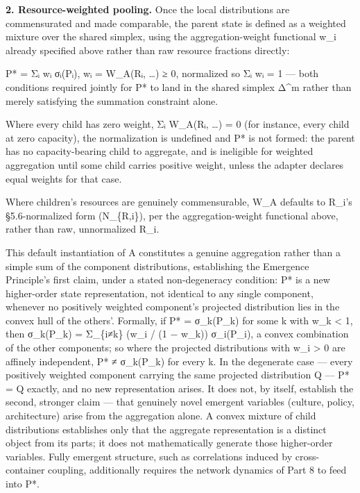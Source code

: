 \documentclass[
]{article}
\begin{document}
\textbf{2. Resource-weighted pooling.} Once the local distributions are
commensurated and made comparable, the parent state is defined as a
weighted mixture over the shared simplex, using the aggregation-weight
functional w\_i already specified above rather than raw resource
fractions directly:

P* = Σᵢ wᵢ σᵢ(Pᵢ), wᵢ = W\_A(Rᵢ, \ldots) ≥ 0, normalized so Σᵢ wᵢ = 1
--- both conditions required jointly for P* to land in the shared
simplex Δ\^{}m rather than merely satisfying the summation constraint
alone.

Where every child has zero weight, Σᵢ W\_A(Rᵢ, \ldots) = 0 (for
instance, every child at zero capacity), the normalization is undefined
and P* is not formed: the parent has no capacity-bearing child to
aggregate, and is ineligible for weighted aggregation until some child
carries positive weight, unless the adapter declares equal weights for
that case.

Where children's resources are genuinely commensurable, W\_A defaults to
R\_i's §5.6-normalized form (N\_\{R,i\}), per the aggregation-weight
functional above, rather than raw, unnormalized R\_i.

This default instantiation of A constitutes a genuine aggregation rather
than a simple sum of the component distributions, establishing the
Emergence Principle's first claim, under a stated non-degeneracy
condition: P* is a new higher-order state representation, not identical
to any single component, whenever no positively weighted component's
projected distribution lies in the convex hull of the others'. Formally,
if P* = σ\_k(P\_k) for some k with w\_k \textless{} 1, then σ\_k(P\_k) =
Σ\_\{i≠k\} (w\_i / (1 − w\_k)) σ\_i(P\_i), a convex combination of the
other components; so where the projected distributions with w\_i
\textgreater{} 0 are affinely independent, P* ≠ σ\_k(P\_k) for every k.
In the degenerate case --- every positively weighted component carrying
the same projected distribution Q --- P* = Q exactly, and no new
representation arises. It does not, by itself, establish the second,
stronger claim --- that genuinely novel emergent variables (culture,
policy, architecture) arise from the aggregation alone. A convex mixture
of child distributions establishes only that the aggregate
representation is a distinct object from its parts; it does not
mathematically generate those higher-order variables. Fully emergent
structure, such as correlations induced by cross-container coupling,
additionally requires the network dynamics of Part 8 to feed into P*.
\end{document}
